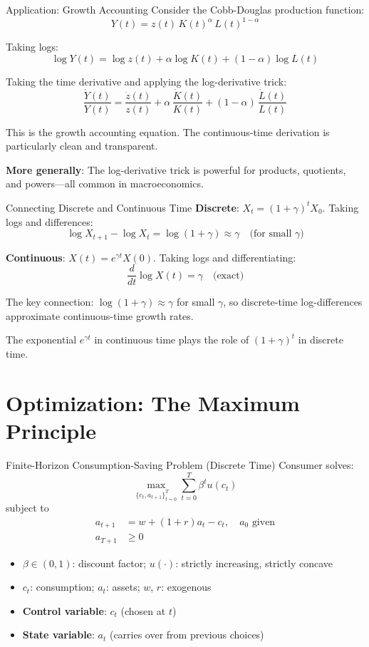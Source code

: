 \documentclass[blue]{beamer}
\begin{document}
\begin{frame}{Application: Growth Accounting}
	Consider the Cobb-Douglas production function:
	\[
	Y(t) = z(t)\, K(t)^\alpha\, L(t)^{1-\alpha}
	\]
	
	Taking logs:
	\[
	\log Y(t) = \log z(t) + \alpha \log K(t) + (1-\alpha)\log L(t)
	\]
	
	Taking the time derivative and applying the log-derivative trick:
	\[
	\frac{\dot{Y}(t)}{Y(t)} = \frac{\dot{z}(t)}{z(t)} + \alpha\, \frac{\dot{K}(t)}{K(t)} + (1-\alpha)\, \frac{\dot{L}(t)}{L(t)}
	\]
	
	This is the growth accounting equation. The continuous-time derivation is particularly clean and transparent.
	
	\bigskip
	\textbf{More generally}: The log-derivative trick is powerful for products, quotients, and powers---all common in macroeconomics.
\end{frame}

\begin{frame}{Connecting Discrete and Continuous Time}
	\textbf{Discrete}: $X_t = (1+\gamma)^t X_0$. Taking logs and differences:
	\[
	\log X_{t+1} - \log X_t = \log(1+\gamma) \approx \gamma \quad \text{(for small $\gamma$)}
	\]
	
	\textbf{Continuous}: $X(t) = e^{\gamma t} X(0)$. Taking logs and differentiating:
	\[
	\frac{d}{dt}\log X(t) = \gamma \quad \text{(exact)}
	\]
	
	\bigskip
	The key connection: $\log(1+\gamma) \approx \gamma$ for small $\gamma$, so discrete-time log-differences approximate continuous-time growth rates.
	
	\bigskip
	The exponential $e^{\gamma t}$ in continuous time plays the role of $(1+\gamma)^t$ in discrete time.
\end{frame}

\section{Optimization: The Maximum Principle}

\begin{frame}{Finite-Horizon Consumption-Saving Problem (Discrete Time)}
	Consumer solves:
	\[
	\max_{\{c_t, a_{t+1}\}_{t=0}^T} \sum_{t=0}^T \beta^t u(c_t)
	\]
	subject to
	\begin{align*}
		a_{t+1} &= w + (1+r)a_t - c_t, \quad a_0 \text{ given} \\
		a_{T+1} &\geq 0
	\end{align*}
	
	\begin{itemize}
		\item $\beta \in (0,1)$: discount factor; $u(\cdot)$: strictly increasing, strictly concave
		\item $c_t$: consumption; $a_t$: assets; $w$, $r$: exogenous
		\item \textbf{Control variable}: $c_t$ (chosen at $t$)
		\item \textbf{State variable}: $a_t$ (carries over from previous choices)
	\end{itemize}
\end{frame}
\end{document}
